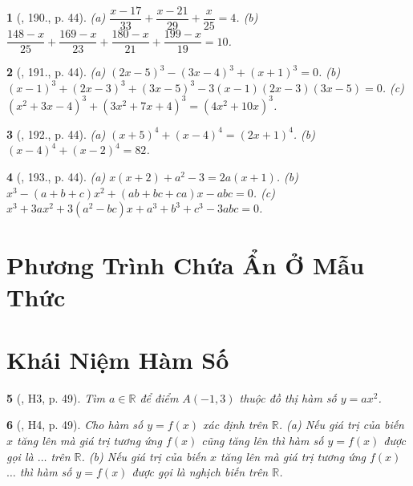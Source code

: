 \documentclass{article}
\newtheorem{baitoan}{}
\begin{document}
\begin{baitoan}[\cite{Tuyen_Toan_8}, 190., p. 44]
	(a) $\dfrac{x - 17}{33} + \dfrac{x - 21}{29} + \dfrac{x}{25} = 4$. (b) $\dfrac{148 - x}{25} + \dfrac{169 - x}{23} + \dfrac{180 - x}{21} + \dfrac{199 - x}{19} = 10$.
\end{baitoan}

\begin{baitoan}[\cite{Tuyen_Toan_8}, 191., p. 44]
	(a) $(2x - 5)^3 - (3x - 4)^3 + (x + 1)^3 = 0$. (b) $(x - 1)^3 + (2x - 3)^3 + (3x - 5)^3 - 3(x - 1)(2x - 3)(3x - 5) = 0$. (c) $(x^2 + 3x - 4)^3 + (3x^2 + 7x + 4)^3 = (4x^2 + 10x)^3$.
\end{baitoan}

\begin{baitoan}[\cite{Tuyen_Toan_8}, 192., p. 44]
	(a) $(x + 5)^4 + (x - 4)^4 = (2x + 1)^4$. (b) $(x - 4)^4 + (x - 2)^4 = 82$.
\end{baitoan}

\begin{baitoan}[\cite{Tuyen_Toan_8}, 193., p. 44]
	(a) $x(x + 2) + a^2 - 3 = 2a(x + 1)$. (b) $x^3 - (a + b + c)x^2 + (ab + bc + ca)x - abc = 0$. (c) $x^3 + 3ax^2 + 3(a^2 - bc)x + a^3 + b^3 + c^3 - 3abc = 0$.
\end{baitoan}


\section{Phương Trình Chứa Ẩn Ở Mẫu Thức}


\section{Khái Niệm Hàm Số}

\begin{baitoan}[\cite{Binh_boi_duong_Toan_9_tap_1}, H3, p. 49]
	Tìm $a\in\mathbb{R}$ để điểm $A(-1,3)$ thuộc đồ thị hàm số $y = ax^2$.
\end{baitoan}

\begin{baitoan}[\cite{Binh_boi_duong_Toan_9_tap_1}, H4, p. 49]
	Cho hàm số $y = f(x)$ xác định trên $\mathbb{R}$. (a) Nếu giá trị của biến $x$ tăng lên mà giá trị tương ứng $f(x)$ cũng tăng lên thì hàm số $y = f(x)$ được gọi là $\ldots$ trên $\mathbb{R}$. (b) Nếu giá trị của biến $x$ tăng lên mà giá trị tương ứng $f(x)$ $\ldots$ thì hàm số $y = f(x)$ được gọi là nghịch biến trên $\mathbb{R}$.
\end{baitoan}
\end{document}
